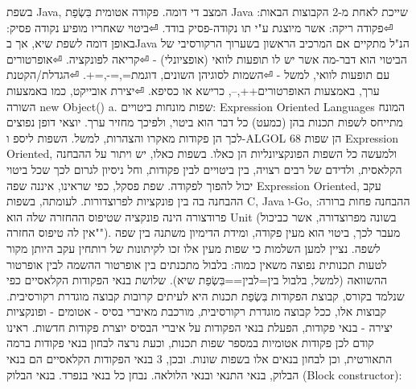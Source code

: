 \begin{טבלא}[!htbp]
        בשפת Java, המצב די דומה. פקודה אטומית בִּשְׂפַת Java שייכת לאחת מ-2 הקבוצות הבאות:
⏎פקודה ריקה: אשר מיוצגת ע"י תו נקודה-פסיק בודד.
⏎ביטוי שאחריו מופיע נקודה פסיק: באופן דומה לשפת שיא, אך בJava הנ"ל מתקיים אם המרכיב הראשון בשערוך הרקורסיבי של הביטוי הוא דבר-מה אשר יש לו תופעות לוואי (אופציונלי) -
⏎קריאה לפונקציה.
⏎אופרטורים עם תופעות לוואי, למשל -
⏎השמות לסוגיהן השונים, דוגמת=,=-,=+.
⏎הגדלת/הקטנת ערך, באמצעות האופרטורים++,--, כרישא או כסיפא.
⏎יצירת אובייקט, כמו באמצעות השורה new Object() a.
        שפות מונחות ביטויים: Expression Oriented Languages
        המונח מתייחס לשפות תכנות בהן (כמעט) כל דבר הוא ביטוי, ולפיכך מחזיר ערך. יוצאי דופן נפוצים לכך הן פקודות מאקרו והצהרות, למשל. השפות ליספ ו-ALGOL 68 הן שפות Expression Oriented, ולמעשה כל השפות הפונקציונליות הן כאלו. בשפות כאלו, יש ויתור על ההבחנה הקלאסית, ולדידם של רבים רצויה, בין ביטויים לבין פקודות, וחל ניסיון לגרום לכך שכל ביטוי יכול להפוך לפקודה.
        שפת פסקל, כפי שראינו, איננה שפה Expression Oriented, עקב ההבחנה בה בין פונקציות לפרוצדורות. לעומתה, בשפות C, Java ו-Go, ההבחנה פחות ברורה: פרודצורה הינה פונקציה שטיפוס ההחזרה שלה הוא Unit (בשונה מפרוצדורה, אשר כביכול "אין לה טיפוס החזרה"). מעבר לכך, ביטוי הוא מעין פקודה, ומידת הדימיון משתנה בין שפה לשפה.
        נציין למען השלמות כי שפות מעין אלו זכו לקיתונות של רותחין עקב היותן מקור לטעות תכנותית נפוצה משאין כמוה: בלבול מתכנתים בין אופרטור ההשמה לבין אופרטור ההשוואה (למשל, בלבול בין=לבין==בִּשְׂפַת שיא).
        שלושת בנאי הפקודות הקלאסיים
        כפי שנלמד בקורס, קבוצת הפקודות בִּשְׂפַת תכנות היא לעיתים קרובות קבוצה מוגדרת רקורסיבית. קבוצות אלו, ככל קבוצה מוגדרת רקורסיבית, מורכבת מאיברי בסיס - אטומים - ופונקציות יצירה - בנאי פקודות, הפעלת בנאי הפקודות על איברי הבסיס יוצרת פקודות חדשות. ראינו קודם לכן פקודות אטומיות במספר שפות תכנות, וכעת נרצה לבחון בנאי פקודות ברמה התאורטית, וכן לבחון בנאים אלו בשפות שונות. ובכן, 3 בנאי הפקודות הקלאסיים הם בנאי הבלוק, בנאי התנאי ובנאי הלולאה. נבחן כל בנאי בנפרד.
        בנאי הבלוק (Block constructor):


\end{טבלא}
